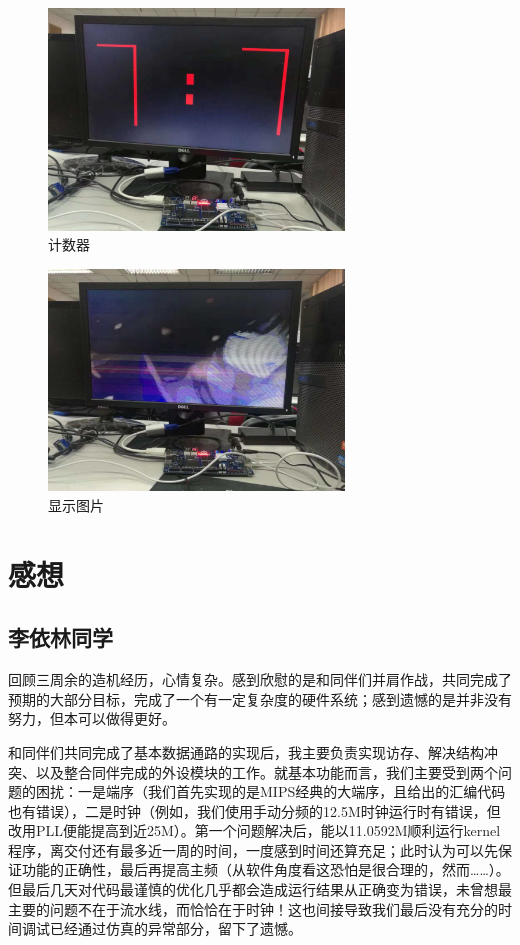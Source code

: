 \documentclass[12pt, utf8, hyperref]{ctexart}
\begin{document}
\begin{figure}[H]
    \centering
    \includegraphics[width=0.7\textwidth]{screenshots/counter.JPG}
    \caption{计数器}
\end{figure}

\begin{figure}[H]
    \centering
    \includegraphics[width=0.7\textwidth]{screenshots/image.JPG}
    \caption{显示图片}
\end{figure}

\section{感想}
\subsection*{李依林同学}
回顾三周余的造机经历，心情复杂。感到欣慰的是和同伴们并肩作战，共同完成了预期的大部分目标，完成了一个有一定复杂度的硬件系统；感到遗憾的是并非没有努力，但本可以做得更好。

和同伴们共同完成了基本数据通路的实现后，我主要负责实现访存、解决结构冲突、以及整合同伴完成的外设模块的工作。就基本功能而言，我们主要受到两个问题的困扰：一是端序（我们首先实现的是MIPS经典的大端序，且给出的汇编代码也有错误），二是时钟（例如，我们使用手动分频的12.5M时钟运行时有错误，但改用PLL便能提高到近25M）。第一个问题解决后，能以11.0592M顺利运行kernel程序，离交付还有最多近一周的时间，一度感到时间还算充足；此时认为可以先保证功能的正确性，最后再提高主频（从软件角度看这恐怕是很合理的，然而……）。但最后几天对代码最谨慎的优化几乎都会造成运行结果从正确变为错误，未曾想最主要的问题不在于流水线，而恰恰在于时钟！这也间接导致我们最后没有充分的时间调试已经通过仿真的异常部分，留下了遗憾。
\end{document}
